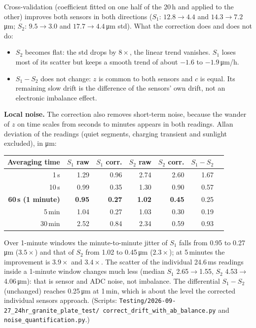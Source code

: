 \documentclass[11pt,a4paper]{article}
\begin{document}
Cross-validation (coefficient fitted on one half of the 20\,h and applied
to the other) improves both sensors in both directions ($S_1$:
$12.8\to4.4$ and $14.3\to7.2$\,\si{\micro\metre}; $S_2$: $9.5\to3.0$ and
$17.7\to4.4$\,\si{\micro\metre} std).  What the correction does and does
not do:
\begin{itemize}
  \item $S_2$ becomes flat: the std drops by $8\times$, the linear trend
        vanishes.  $S_1$ loses most of its scatter but keeps a smooth
        trend of about $-1.6$ to $-1.9$\,\si{\micro\metre}/h.
  \item $S_1-S_2$ does not change: $z$ is common to both sensors and $c$ is
        equal.  Its remaining slow drift is the difference of the sensors'
        own drift, not an electronic imbalance effect.
\end{itemize}

\textbf{Local noise.}  The correction also removes short-term noise, because
the wander of $z$ on time scales from seconds to minutes appears in both
readings.  Allan deviation of the readings (quiet segments, charging
transient and sunlight excluded), in \si{\micro\metre}:
\begin{center}
\small
\begin{tabular}{@{}rrrrrrr@{}}
\toprule
Averaging time & $S_1$ raw & $S_1$ corr. & $S_2$ raw & $S_2$ corr. & $S_1-S_2$ \\
\midrule
1\,s     & 1.29 & 0.96 & 2.74 & 2.60 & 1.67 \\
10\,s    & 0.99 & 0.35 & 1.30 & 0.90 & 0.57 \\
\textbf{60\,s (1 minute)} & \textbf{0.95} & \textbf{0.27} & \textbf{1.02} & \textbf{0.45} & 0.25 \\
5\,min   & 1.04 & 0.27 & 1.03 & 0.30 & 0.19 \\
30\,min  & 2.52 & 0.84 & 2.34 & 0.59 & 0.93 \\
\bottomrule
\end{tabular}
\end{center}
Over 1-minute windows the minute-to-minute jitter of $S_1$ falls from 0.95
to 0.27\,\si{\micro\metre} ($3.5\times$) and that of $S_2$ from 1.02 to
0.45\,\si{\micro\metre} ($2.3\times$); at 5\,minutes the improvement is
$3.9\times$ and $3.4\times$.  The scatter of the individual 24.6\,ms
readings inside a 1-minute window changes much less (median $S_1$
2.65$\to$1.55, $S_2$ 4.53$\to$4.06\,\si{\micro\metre}): that is
sensor and ADC noise, not imbalance.  The differential $S_1-S_2$ (unchanged)
reaches 0.25\,\si{\micro\metre} at 1\,min, which is about the level the
corrected individual sensors approach.  (Scripts:
\texttt{Testing/2026-09-27\_24hr\_granite\_plate\_test/\allowbreak
correct\_drift\_with\_ab\_balance.py} and
\texttt{noise\_quantification.py}.)
\end{document}
